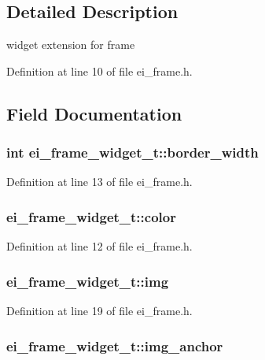 \subsection{Detailed Description}
widget extension for frame 

Definition at line 10 of file ei\_\-frame.h.

\subsection{Field Documentation}
\hypertarget{structei__frame__widget__t_a3c9f48c109681702db85b9e02a60cd1a}{
\subsubsection[{border\_\-width}]{\setlength{\rightskip}{0pt plus 5cm}int {\bf ei\_\-frame\_\-widget\_\-t::border\_\-width}}}
\label{structei__frame__widget__t_a3c9f48c109681702db85b9e02a60cd1a}


Definition at line 13 of file ei\_\-frame.h.\hypertarget{structei__frame__widget__t_ad5655f5b5eca009feaa3e1cbe3c0e761}{
\subsubsection[{color}]{ {\bf ei\_\-frame\_\-widget\_\-t::color}}}
\label{structei__frame__widget__t_ad5655f5b5eca009feaa3e1cbe3c0e761}


Definition at line 12 of file ei\_\-frame.h.\hypertarget{structei__frame__widget__t_abd19824f244fc5a498cd9e7df6343a91}{
\subsubsection[{img}]{ {\bf ei\_\-frame\_\-widget\_\-t::img}}}
\label{structei__frame__widget__t_abd19824f244fc5a498cd9e7df6343a91}


Definition at line 19 of file ei\_\-frame.h.\hypertarget{structei__frame__widget__t_aaaf211e8637c20e80723009615f625a9}{
\subsubsection[{img\_\-anchor}]{ {\bf ei\_\-frame\_\-widget\_\-t::img\_\-anchor}}}
\label{structei__frame__widget__t_aaaf211e8637c20e80723009615f625a9}



